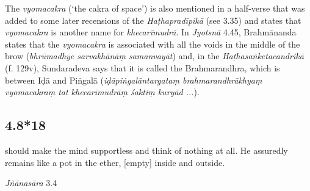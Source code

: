 \begin{ekdosis}
\begin{sources}[hp04_008_17]
\end{sources}


\begin{philcomm}[hp04_008_17]
The \emph{vyomacakra} (`the cakra of space') is also mentioned in a half-verse that was added to some later recensions of the \emph{Haṭhapradīpikā} (see 3.35) and states that \emph{vyomacakra} is another name for \emph{khecarīmudrā}. In \emph{Jyotsnā} 4.45, Brahmānanda states that the \emph{vyomacakra} is associated with all the voids in the middle of the brow (\emph{bhrūmadhye sarvakhānāṃ samanvayāt}) and, in the \emph{Haṭhasaṅketacandrikā} (f. 129v), Sundaradeva says that it is called the Brahmarandhra, which is between Iḍā and Piṅgalā (\emph{iḍāpiṅgalāntargataṃ brahmarandhrākhyaṃ vyomacakraṃ tat khecarīmudrāṃ śaktiṃ kuryād ...}). 
%
\end{philcomm}

\subsection*{4.8*18}
\begin{translation} should make the mind supportless and think of nothing at all. He assuredly remains like a pot in the ether, [empty] inside and outside.
\end{translation}

\begin{sources}[hp04_008_18]
\emph{Jñānasāra} 3.4
\begin{versinnote}
\end{versinnote}

\end{sources}



\end{ekdosis}

